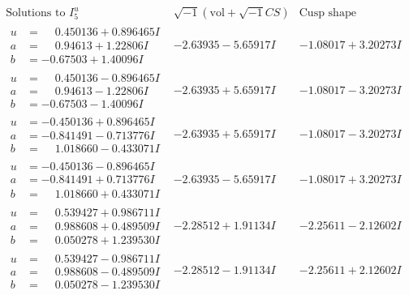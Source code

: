 \documentclass[1p]{elsarticle_modified}
\theoremstyle{definition}
\newcommand{\I}{\sqrt{-1}}
\begin{document}
$$\begin{array}{c|c|c}  
\text{Solutions to }I^u_{5}& \I (\text{vol} + \sqrt{-1}CS) & \text{Cusp shape}\\
 \hline 
\begin{aligned}
u &= \phantom{-}0.450136 + 0.896465 I \\
a &= \phantom{-}0.94613 + 1.22806 I \\
b &= -0.67503 + 1.40096 I\end{aligned}
 & -2.63935 - 5.65917 I & -1.08017 + 3.20273 I \\ \hline\begin{aligned}
u &= \phantom{-}0.450136 - 0.896465 I \\
a &= \phantom{-}0.94613 - 1.22806 I \\
b &= -0.67503 - 1.40096 I\end{aligned}
 & -2.63935 + 5.65917 I & -1.08017 - 3.20273 I \\ \hline\begin{aligned}
u &= -0.450136 + 0.896465 I \\
a &= -0.841491 - 0.713776 I \\
b &= \phantom{-}1.018660 - 0.433071 I\end{aligned}
 & -2.63935 + 5.65917 I & -1.08017 - 3.20273 I \\ \hline\begin{aligned}
u &= -0.450136 - 0.896465 I \\
a &= -0.841491 + 0.713776 I \\
b &= \phantom{-}1.018660 + 0.433071 I\end{aligned}
 & -2.63935 - 5.65917 I & -1.08017 + 3.20273 I \\ \hline\begin{aligned}
u &= \phantom{-}0.539427 + 0.986711 I \\
a &= \phantom{-}0.988608 + 0.489509 I \\
b &= \phantom{-}0.050278 + 1.239530 I\end{aligned}
 & -2.28512 + 1.91134 I & -2.25611 - 2.12602 I \\ \hline\begin{aligned}
u &= \phantom{-}0.539427 - 0.986711 I \\
a &= \phantom{-}0.988608 - 0.489509 I \\
b &= \phantom{-}0.050278 - 1.239530 I\end{aligned}
 & -2.28512 - 1.91134 I & -2.25611 + 2.12602 I \\ \hline\begin{aligned}

\end{aligned}
\end{array}$$
\end{document}
